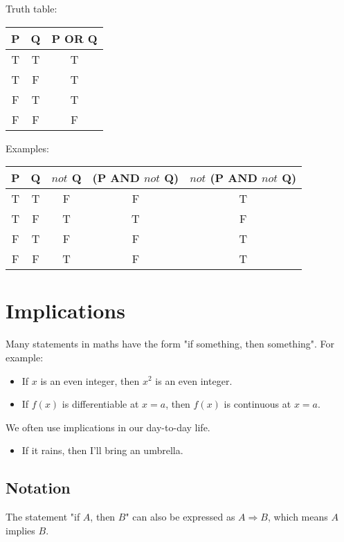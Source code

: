 \documentclass[11pt]{article}
\begin{document}
Truth table:

\begin{center}
\begin{tabular}{ |c|c|c| }
\hline
P & Q & P OR Q \\
\hline
T & T & T \\
\hline
T & F & T \\
\hline
F & T & T \\
\hline
F & F & F \\
\hline
\end{tabular}
\end{center}

Examples:

\begin{center}
\begin{tabular}{ |c|c|c|c|c| }
\hline
P & Q & $not$ Q & (P AND $not$ Q) & $not$ (P AND $not$ Q) \\
\hline
T & T & F & F & T \\
\hline
T & F & T & T & F \\
\hline
F & T & F & F & T \\
\hline
F & F & T & F & T \\
\hline
\end{tabular}
\end{center}

\newpage


\section{Implications}
\label{sec:orga7b959d}
Many statements in maths have the form "if something, then something". For example:
\begin{itemize}
\item If \(x\) is an even integer, then \(x^2\) is an even integer.
\item If \(f(x)\) is differentiable at \(x = a\), then \(f(x)\) is continuous at \(x = a\).
\end{itemize}

We often use implications in our day-to-day life.
\begin{itemize}
\item If it rains, then I'll bring an umbrella.
\end{itemize}

\subsection{Notation}
\label{sec:orgc3db0a0}
The statement "if \(A\), then \(B\)" can also be expressed as \(A \Rightarrow B\), which means \(A\) implies \(B\).
\end{document}
